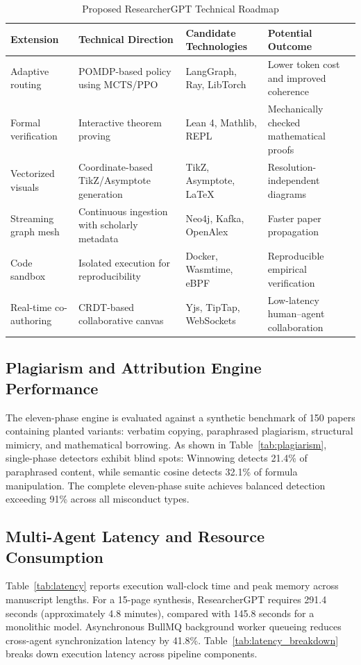 \documentclass[conference]{IEEEtran}
\begin{document}
\begin{table}[!t]
\centering
\caption{Proposed ResearcherGPT Technical Roadmap}
\label{tab:roadmap}
\small
\begin{tabularx}{\textwidth}{@{}l X X X@{}}
\toprule
\textbf{Extension} & \textbf{Technical Direction} & \textbf{Candidate Technologies} & \textbf{Potential Outcome} \\
\midrule
Adaptive routing & POMDP-based policy using MCTS/PPO & LangGraph, Ray, LibTorch & Lower token cost and improved coherence \\
Formal verification & Interactive theorem proving & Lean 4, Mathlib, REPL & Mechanically checked mathematical proofs \\
Vectorized visuals & Coordinate-based TikZ/Asymptote generation & TikZ, Asymptote, \LaTeX & Resolution-independent diagrams \\
Streaming graph mesh & Continuous ingestion with scholarly metadata & Neo4j, Kafka, OpenAlex & Faster paper propagation \\
Code sandbox & Isolated execution for reproducibility & Docker, Wasmtime, eBPF & Reproducible empirical verification \\
Real-time co-authoring & CRDT-based collaborative canvas & Yjs, TipTap, WebSockets & Low-latency human--agent collaboration \\
\bottomrule
\end{tabularx}
\end{table}

\subsection{Plagiarism and Attribution Engine Performance}
The eleven-phase engine is evaluated against a synthetic benchmark of 150 papers containing planted variants: verbatim copying, paraphrased plagiarism, structural mimicry, and mathematical borrowing. As shown in Table~\ref{tab:plagiarism}, single-phase detectors exhibit blind spots: Winnowing detects 21.4\% of paraphrased content, while semantic cosine detects 32.1\% of formula manipulation. The complete eleven-phase suite achieves balanced detection exceeding 91\% across all misconduct types.


\subsection{Multi-Agent Latency and Resource Consumption}
Table~\ref{tab:latency} reports execution wall-clock time and peak memory across manuscript lengths. For a 15-page synthesis, ResearcherGPT requires 291.4 seconds (approximately 4.8 minutes), compared with 145.8 seconds for a monolithic model. Asynchronous BullMQ background worker queueing reduces cross-agent synchronization latency by 41.8\%. Table~\ref{tab:latency_breakdown} breaks down execution latency across pipeline components.
\end{document}
